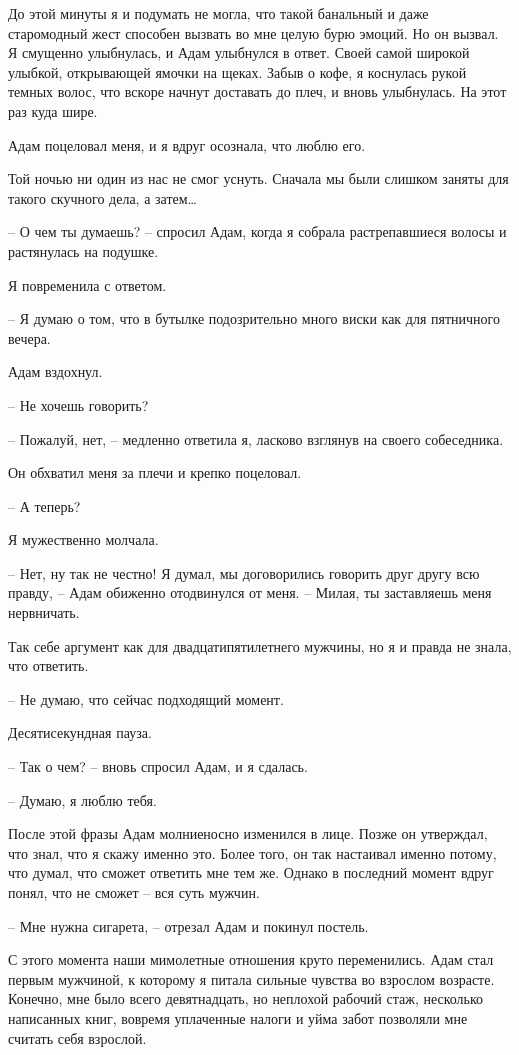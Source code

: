 \documentclass[
]{book}
\begin{document}
До этой минуты я и подумать не могла, что такой банальный и даже старомодный жест способен вызвать во мне целую бурю эмоций. Но он вызвал. Я смущенно улыбнулась, и Адам улыбнулся в ответ. Своей самой широкой улыбкой, открывающей ямочки на щеках. Забыв о кофе, я коснулась рукой темных волос, что вскоре начнут доставать до плеч, и вновь улыбнулась. На этот раз куда шире.

Адам поцеловал меня, и я вдруг осознала, что люблю его.

Той ночью ни один из нас не смог уснуть. Сначала мы были слишком заняты для такого скучного дела, а затем\ldots{}

-- О чем ты думаешь? -- спросил Адам, когда я собрала растрепавшиеся волосы и растянулась на подушке.

Я повременила с ответом.

-- Я думаю о том, что в бутылке подозрительно много виски как для пятничного вечера.

Адам вздохнул.

-- Не хочешь говорить?

-- Пожалуй, нет, -- медленно ответила я, ласково взглянув на своего собеседника.

Он обхватил меня за плечи и крепко поцеловал.

-- А теперь?

Я мужественно молчала.

-- Нет, ну так не честно! Я думал, мы договорились говорить друг другу всю правду, -- Адам обиженно отодвинулся от меня. -- Милая, ты заставляешь меня нервничать.

Так себе аргумент как для двадцатипятилетнего мужчины, но я и правда не знала, что ответить.

-- Не думаю, что сейчас подходящий момент.

Десятисекундная пауза.

-- Так о чем? -- вновь спросил Адам, и я сдалась.

-- Думаю, я люблю тебя.

После этой фразы Адам молниеносно изменился в лице. Позже он утверждал, что знал, что я скажу именно это. Более того, он так настаивал именно потому, что думал, что сможет ответить мне тем же. Однако в последний момент вдруг понял, что не сможет -- вся суть мужчин.

-- Мне нужна сигарета, -- отрезал Адам и покинул постель.

С этого момента наши мимолетные отношения круто переменились. Адам стал первым мужчиной, к которому я питала сильные чувства во взрослом возрасте. Конечно, мне было всего девятнадцать, но неплохой рабочий стаж, несколько написанных книг, вовремя уплаченные налоги и уйма забот позволяли мне считать себя взрослой.
\end{document}
